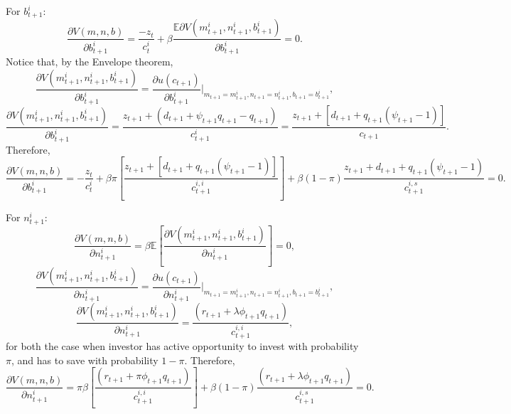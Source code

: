 \documentclass[12pt]{article}%
\begin{document}
For $b^i_{t+1}$:
\begin{equation}
\frac{\partial V(m,n,b)}{\partial b^i_{t+1}} = \frac{-z_t}{c^i_t}+\beta \frac{\mathbb{E}\partial V(m^i_{t+1},n^i_{t+1}
, b^i_{t+1})}{\partial b^i_{t+1}}=0.
\end{equation}
Notice that, by the Envelope theorem,
\begin{equation}
\frac{\partial V(m^i_{t+1},n^i_{t+1},b^i_{t+1})}{\partial b^i_{t+1}} = \frac{\partial
u(c_{t+1})}{\partial b^i_{t+1}}\bigg|_{m_{t+1}=m^i_{t+1},
n_{t+1}=n^i_{t+1},b_{t+1}=b^i_{t+1}},
\end{equation}
\begin{equation}
\frac{\partial V(m^i_{t+1}, n^i_{t+1}, b^i_{t+1})}{\partial b^i_{t+1}} = \frac{z_{t+1}+(d_{t+1}+\psi_{t+1}q_{t+1}-q_{t+1})}{c^i_{t+1}}
= \frac{z_{t+1}+[d_{t+1}+q_{t+1}(\psi_{t+1}-1)]}{c_{t+1}}.
\end{equation}
Therefore,
\begin{equation}
\frac{\partial V(m,n,b)}{\partial b^i_{t+1}} = -\frac{z_{t}}{c^i_t}+\beta \pi [\frac{z_{t+1}+[d_{t+1}+q_{t+1}
(\psi_{t+1}-1)]}{c^{i,i}_{t+1}}]+\beta (1-\pi)
\frac{z_{t+1}+d_{t+1}+q_{t+1}(\psi_{t+1}-1)}{c^{i,s}_{t+1}}=0.
\end{equation}

For $n^i_{t+1}$:
\begin{equation}
\frac{\partial V(m,n,b)}{\partial n^i_{t+1}}=\beta \mathbb{E}[\frac{\partial V(m^i_{t+1},n^i_{t+1}, b^i_{t+1})}{\partial n^i_{t+1}}]
= 0,
\end{equation}
\begin{equation}
\frac{\partial V(m^i_{t+1},n^i_{t+1},b^i_{t+1})}{\partial n^i_{t+1}}=
\frac{\partial u(c_{t+1})}{\partial n^i_{t+1}}
\bigg|_{m_{t+1}=m^i_{t+1},
n_{t+1}=n^i_{t+1},b_{t+1}=b^i_{t+1}},
\end{equation}
\begin{equation}
\frac{\partial V(m^i_{t+1},n^i_{t+1},b^i_{t+1})}{\partial n^i_{t+1}}=
\frac{(r_{t+1}+\lambda \phi_{t+1}q_{t+1})}{c^{i,i}_{t+1}},
\end{equation}
for both the case when investor has active opportunity to invest with
probability $\pi$, and has to save with probability $1-\pi$. Therefore,
\begin{equation}
\frac{\partial V(m,n,b)}{\partial n^i_{t+1}}=
\pi \beta [\frac{(r_{t+1}+\pi \phi_{t+1} q_{t+1})}{c^{i,i}_{t+1}}]
+ \beta (1-\pi) \frac{(r_{t+1}+\lambda \phi_{t+1}q_{t+1})}{c^{i,s}_{t+1}}=0.
\end{equation}
\end{document}
